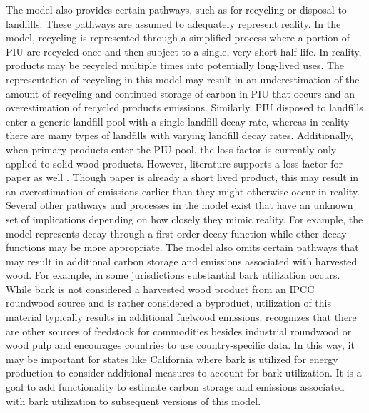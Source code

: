 \documentclass[
  openany]{book}
\begin{document}
The model also provides certain pathways, such as for recycling or disposal to landfills. These pathways are assumed to adequately represent reality. In the model, recycling is represented through a simplified process where a portion of PIU are recycled once and then subject to a single, very short half-life. In reality, products may be recycled multiple times into potentially long-lived uses. The representation of recycling in this model may result in an underestimation of the amount of recycling and continued storage of carbon in PIU that occurs and an overestimation of recycled products emissions. Similarly, PIU disposed to landfills enter a generic landfill pool with a single landfill decay rate, whereas in reality there are many types of landfills with varying landfill decay rates. Additionally, when primary products enter the PIU pool, the loss factor is currently only applied to solid wood products. However, literature supports a loss factor for paper as well \autocite{skog1998}. Though paper is already a short lived product, this may result in an overestimation of emissions earlier than they might otherwise occur in reality. Several other pathways and processes in the model exist that have an unknown set of implications depending on how closely they mimic reality. For example, the model represents decay through a first order decay function while other decay functions may be more appropriate. The model also omits certain pathways that may result in additional carbon storage and emissions associated with harvested wood. For example, in some jurisdictions substantial bark utilization occurs. While bark is not considered a harvested wood product from an IPCC roundwood source \autocite{buendia2019} and is rather considered a byproduct, utilization of this material typically results in additional fuelwood emissions. \textcite{ipcc2014} recognizes that there are other sources of feedstock for commodities besides industrial roundwood or wood pulp and encourages countries to use country-specific data. In this way, it may be important for states like California where bark is utilized for energy production \autocite{marcille2020} to consider additional measures to account for bark utilization. It is a goal to add functionality to estimate carbon storage and emissions associated with bark utilization to subsequent versions of this model.
\end{document}
